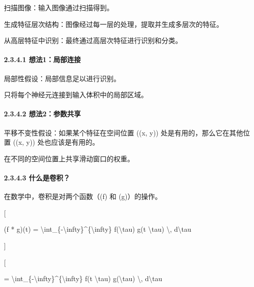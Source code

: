 扫描图像：输入图像通过扫描得到。

生成特征层次结构：图像经过每一层的处理，提取并生成多层次的特征。

从高层特征中识别：最终通过高层次特征进行识别和分类。

\paragraph{\texorpdfstring{ }{ }}\label{-2}

\paragraph{\texorpdfstring{\textbf{2.3.4.1}
\textbf{想法1：局部连接}}{2.3.4.1 想法1：局部连接}}\label{2341-ux60f3ux6cd51ux5c40ux90e8ux8fdeux63a5}

局部性假设：局部信息足以进行识别。

只将每个神经元连接到输入体积中的局部区域。


\paragraph{\texorpdfstring{\textbf{2.3.4.2}
\textbf{想法2：参数共享}}{2.3.4.2 想法2：参数共享}}\label{2342-ux60f3ux6cd52ux53c2ux6570ux5171ux4eab}

平移不变性假设：如果某个特征在空间位置 ((x, y))
处是有用的，那么它在其他位置 ((x\textquotesingle, y\textquotesingle))
处也应该是有用的。

在不同的空间位置上共享滑动窗口的权重。

\paragraph{\texorpdfstring{\textbf{2.3.4.3}
\textbf{什么是卷积？}}{2.3.4.3 什么是卷积？}}\label{2343-ux4ec0ux4e48ux662fux5377ux79ef}

在数学中，卷积是对两个函数（(f) 和 (g)）的操作。

{[}

(f * g)(t) =
\textbackslash int\_\{-\textbackslash infty\}\^{}\{\textbackslash infty\}
f(\textbackslash tau) g(t \textbackslash tau) \textbackslash,
d\textbackslash tau

{]}

{[}

=
\textbackslash int\_\{-\textbackslash infty\}\^{}\{\textbackslash infty\}
f(t \textbackslash tau) g(\textbackslash tau) \textbackslash,
d\textbackslash tau

